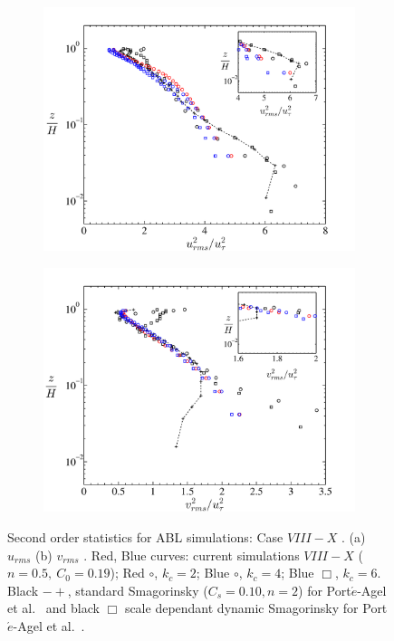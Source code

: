 \begin{figure}
\centering
        \begin{subfigure}[t]{0.75\textwidth}
                \includegraphics[width=\linewidth]{Fig3/urms_filter_n05.pdf}
                \caption{}
                \label{fig:urms1}
        \end{subfigure}
        \centering
        \begin{subfigure}[t]{0.75\textwidth}
                \includegraphics[width=\linewidth]{Fig3/vrms_filter_n05.pdf}
                \caption{}
                \label{fig:vrms1}
        \end{subfigure}
        \caption[Second order statistics $u_{rms}, \ v_{rms}$, Case $VIII-X$]{Second order statistics for ABL simulations: Case $VIII-X$ . (a) $u_{rms}$ (b) $v_{rms}$ . Red, Blue curves: current simulations $VIII-X$ ($n = 0.5, \ C_0 = 0.19$);  Red $\circ$, $k_{c}=2$; Blue $\circ$, $k_{c} = 4$; Blue $\Box$, $k_{c} = 6$.  Black $-+$, standard Smagorinsky ($C_s = 0.10, n = 2$)  {for Port$\acute{e}$-Agel et al.~\cite{porte1fun}} and black $\Box$ scale dependant dynamic Smagorinsky for Port$\acute{e}$-Agel et al.~\cite{porte1fun}.}\label{fig:stat021}
\end{figure}

